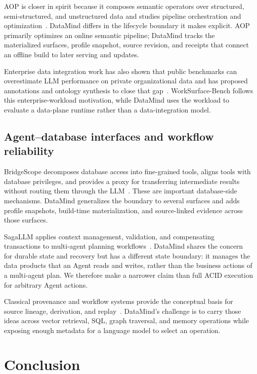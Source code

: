 AOP is closer in spirit because it composes semantic operators over structured,
semi-structured, and unstructured data and studies pipeline orchestration and
optimization~\cite{wang2025aop}. DataMind differs in the lifecycle boundary it
makes explicit. AOP primarily optimizes an online semantic pipeline; DataMind
tracks the materialized surfaces, profile snapshot, source revision, and
receipts that connect an offline build to later serving and updates.

Enterprise data integration work has also shown that public benchmarks can
overestimate LLM performance on private organizational data and has proposed
annotations and ontology synthesis to close that gap~\cite{kayali2025mindgap}.
WorkSurface-Bench follows this enterprise-workload motivation, while DataMind
uses the workload to evaluate a data-plane runtime rather than a data-integration
model.

\subsection{Agent--database interfaces and workflow reliability}
\label{sec:related-reliability}

BridgeScope decomposes database access into fine-grained tools, aligns tools
with database privileges, and provides a proxy for transferring intermediate
results without routing them through the LLM~\cite{weng2026bridgescope}. These
are important database-side mechanisms. DataMind generalizes the boundary to
several surfaces and adds profile snapshots, build-time materialization, and
source-linked evidence across those surfaces.

SagaLLM applies context management, validation, and compensating transactions
to multi-agent planning workflows~\cite{chang2025sagallm}. DataMind shares the
concern for durable state and recovery but has a different state boundary: it
manages the data products that an Agent reads and writes, rather than the
business actions of a multi-agent plan. We therefore make a narrower claim
than full ACID execution for arbitrary Agent actions.

Classical provenance and workflow systems provide the conceptual basis for
source lineage, derivation, and replay~\cite{cheney2009provenance,green2007provenance}.
DataMind's challenge is to carry those ideas across vector retrieval, SQL,
graph traversal, and memory operations while exposing enough metadata for a
language model to select an operation.

\section{Conclusion}
\label{sec:conclusion}

